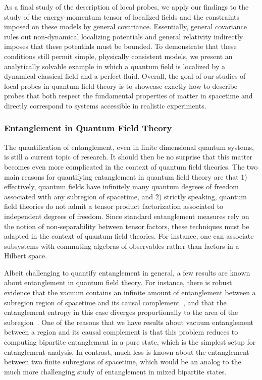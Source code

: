 \documentclass[letterpaper,12pt,titlepage,oneside,final]{book}
\begin{document}
As a final study of the description of local probes, we apply our findings to the study of the energy-momentum tensor of localized fields and the constraints imposed on these models by general covariance. Essentially, general covariance rules out non-dynamical localizing potentials and general relativity indirectly imposes that these potentials must be bounded. To demonstrate that these conditions still permit simple, physically consistent models, we present an analytically solvable example in which a quantum field is localized by a dynamical classical field and a perfect fluid. Overall, the goal of our studies of local probes in quantum field theory is to showcase exactly how to describe probes that both respect the fundamental properties of matter in spacetime and directly correspond to systems accessible in realistic experiments.


\subsubsection*{Entanglement in Quantum Field Theory}

The quantification of entanglement, even in finite dimensional quantum 
systems, is still a current topic of research. It should then be no surprise that this matter becomes even more complicated in the context of quantum field theories. The two main reasons for quantifying entanglement in quantum field theory are that 1) effectively, quantum fields have infinitely many quantum degrees of freedom associated with any subregion of spacetime, and 2) strictly speaking, quantum field theories do not admit a tensor product factorization associated to independent degrees of freedom. Since standard entanglement measures rely on the notion of non-separability between tensor factors, these techniques must be adapted in the context of quantum field theories. For instance, one can associate subsystems with commuting algebras of observables rather than factors in a Hilbert space.

Albeit challenging to quantify entanglement in general, a few results are known about entanglement in quantum field theory. For instance, there is robust evidence that the vacuum contains an infinite amount of entanglement between a subregion region of spacetime and its causal complement~\cite{universalEmbezzlers}, and that the entanglement entropy in this case diverges proportionally to the area of the subregion~\cite{areaLaw1993}. One of the reasons that we have results about vacuum entanglement between a region and its causal complement is that this problem reduces to computing bipartite entanglement in a pure state, which is the simplest setup for entanglement analysis. In contrast, much less is known about the entanglement between two finite subregions of spacetime, which would be an analog to the much more challenging study of entanglement in mixed bipartite states.
\end{document}
